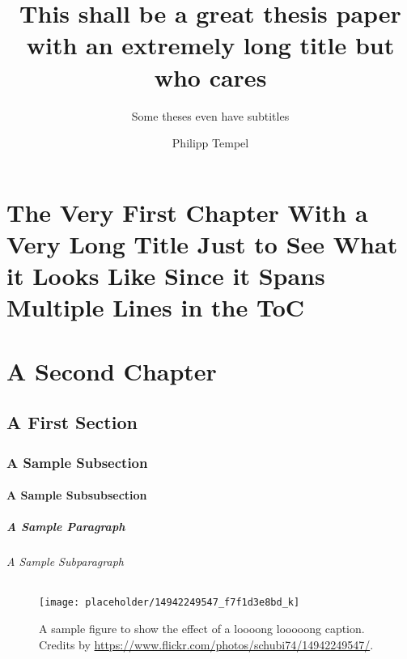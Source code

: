 \documentclass[%
    thesis=ma, %
    language=american, %
    paper=a4,%
    listings,
    online,
    final,
]{isw}
\title{This shall be a great thesis paper with an extremely long title but who cares}
\subtitle{Some theses even have subtitles}
\author{Philipp Tempel}
\begin{document}
    \maketitle
    
    \begin{otherlanguage}{ngerman}\maketitle \end{otherlanguage}
    
    \tableofcontents
    
    \listoffigures
    
    \listoftables
    
    \listoftodos
    
    \chapter[The Short Title of the Chapter Showing Up in the TOC and the Page Headers]{The Very First Chapter With a Very Long Title Just to See What it Looks Like Since it Spans Multiple Lines in the ToC}
    
    \chapter{A Second Chapter}
    
    \section{A First Section}
    
    \subsection{A Sample Subsection}
    
    \subsubsection{A Sample Subsubsection}
    
    \paragraph{A Sample Paragraph}
    
    \subparagraph{A Sample Subparagraph}
    
    \begin{figure}
        \centering
        \texttt{[image: placeholder/14942249547\_f7f1d3e8bd\_k]}
        \caption{A sample figure to show the effect of a loooong looooong caption. Credits by \url{https://www.flickr.com/photos/schubi74/14942249547/}.}
        \label{fig:sample-figure}
    \end{figure}
    
\end{document}
